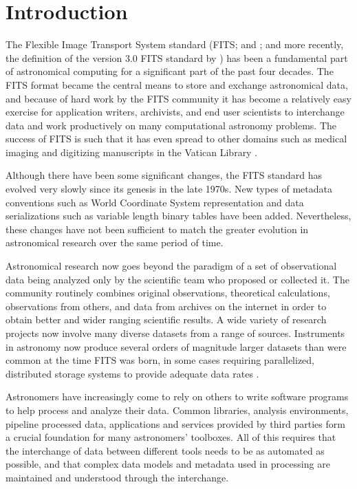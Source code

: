 \documentclass[final,authoryear,5p,times,twocolumn]{elsarticle}
\begin{document}
\section{Introduction}


The Flexible Image Transport System standard (FITS;
\citealt{1979ipia.coll..445W,1980SPIE..264..298G,1981A&AS...44..363W,1981A&AS...44..371G} and
\citealt{2001A&A...376..359H}; and more recently, the definition of the
version 3.0 FITS standard by \citealt{2010A&A...524A..42P}) has been a
fundamental part of astronomical computing for a significant part of the
past four decades. The FITS format became the central means to store and
exchange astronomical data, and because of hard work by the FITS
community it has become a relatively easy exercise for application
writers, archivists, and end user scientists to interchange data and
work productively on many computational astronomy problems. The success
of FITS is such that it has even spread to other domains such as medical
imaging and digitizing manuscripts in the Vatican Library
\citep{2006JRASC.100..242W,2012EWASSAlle}.


Although there have been some significant changes, the FITS standard
has evolved very slowly since its genesis in the late 1970s. New types
of metadata conventions such as World Coordinate System
\citep[WCS;][]{2002A&A...395.1061G,2002A&A...395.1077C,2006A&A...446..747G}
representation and data serializations such as variable length binary
tables \citep{1995A&AS..113..159C} have been added. Nevertheless,
these changes have not been sufficient to match the greater evolution
in astronomical research over the same period of time.


Astronomical research now goes beyond the paradigm of a set of
observational data being analyzed only by the scientific team who
proposed or collected it. The community routinely combines original
observations, theoretical calculations, observations from others, and
data from archives on the internet in order to obtain better and wider
ranging scientific results. A wide variety of research projects now involve many
diverse datasets from a range of sources. Instruments in astronomy
now produce several orders of magnitude larger datasets than were common
at the time FITS was born, in some cases requiring parallelized,
distributed storage systems to provide adequate data rates
\citep{2012ASPC..461..283A}.


Astronomers have increasingly come to rely on others to write software
programs to help process and analyze their data. Common libraries, analysis
environments, pipeline processed data, applications and services
provided by third parties form a crucial foundation for many
astronomers' toolboxes. All of this requires that the interchange of
data between different tools needs to be as automated as possible, and
that complex data models and metadata used in processing are
maintained and understood through the interchange.
\end{document}
